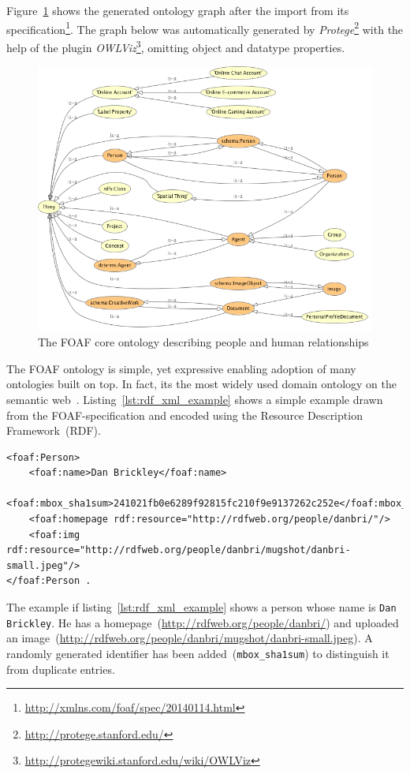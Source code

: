 \documentclass{article}
\begin{document}
Figure~\ref{fig:foaf-ontology} shows the generated ontology graph after the import from its specification\footnote{\url{http://xmlns.com/foaf/spec/20140114.html}}.
The graph below was automatically generated by \textit{Protege}\footnote{\url{http://protege.stanford.edu/}} with the help of the plugin \textit{OWLViz}\footnote{\url{http://protegewiki.stanford.edu/wiki/OWLViz}}, omitting object and datatype properties.
\begin{figure}[H]
	\centering \includegraphics*[width=.8\columnwidth]{foaf-ontology.png}
	\caption{The FOAF core ontology describing people and human relationships}
	\label{fig:foaf-ontology}
\end{figure}
The FOAF ontology is simple, yet expressive enabling adoption of many ontologies built on top. In fact, its the most widely used domain ontology on the semantic web~\cite{article:social-networking}. Listing~\ref{lst:rdf_xml_example} shows a simple example drawn from the FOAF-specification and encoded using the Resource Description Framework~(RDF)\cite{article:rdf}.

\begin{lstlisting}[caption={RDF/XML representation of a person using the FOAF vocabulary},label={lst:rdf_xml_example}]
<foaf:Person>
	<foaf:name>Dan Brickley</foaf:name>
	<foaf:mbox_sha1sum>241021fb0e6289f92815fc210f9e9137262c252e</foaf:mbox_sha1sum>
	<foaf:homepage rdf:resource="http://rdfweb.org/people/danbri/"/>
	<foaf:img rdf:resource="http://rdfweb.org/people/danbri/mugshot/danbri-small.jpeg"/>
</foaf:Person .
\end{lstlisting}

The example if listing~\ref{lst:rdf_xml_example} shows a person whose name is \texttt{Dan Brickley}. He has a homepage~(\url{http://rdfweb.org/people/danbri/}) and uploaded an image~(\url{http://rdfweb.org/people/danbri/mugshot/danbri-small.jpeg}). A randomly generated identifier has been added~(\texttt{mbox\_sha1sum}) to distinguish it from duplicate entries. 
\end{document}
